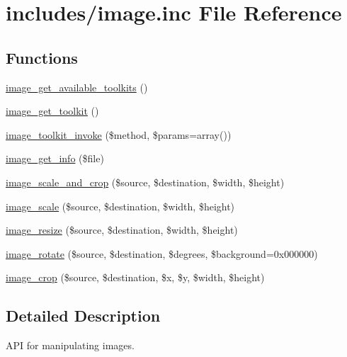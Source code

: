 \hypertarget{image_8inc}{
\section{includes/image.inc File Reference}
\label{image_8inc}
}
\subsection*{Functions}
\begin{CompactItemize}
\item 
\hyperlink{group__image_g190b9b90f931916a5766ed11c29b9326}{image\_\-get\_\-available\_\-toolkits} ()
\item 
\hyperlink{group__image_g08b3ce83f3526f248c1e08b4ee249a3a}{image\_\-get\_\-toolkit} ()
\item 
\hyperlink{group__image_g5429299fdb0dd86b5c8050dc1dba5aee}{image\_\-toolkit\_\-invoke} (\$method, \$params=array())
\item 
\hyperlink{group__image_g64daec548dec0ae4c1d30053446e8f80}{image\_\-get\_\-info} (\$file)
\item 
\hyperlink{group__image_g61e985c6a47a4c9d788b99fba2d452a6}{image\_\-scale\_\-and\_\-crop} (\$source, \$destination, \$width, \$height)
\item 
\hyperlink{group__image_g4015f61f8b5214787a6f649befd4b7bb}{image\_\-scale} (\$source, \$destination, \$width, \$height)
\item 
\hyperlink{group__image_g160782a6325283b224cba85e2a4d3839}{image\_\-resize} (\$source, \$destination, \$width, \$height)
\item 
\hyperlink{group__image_g6827b6bfbfee059fa956f5c3d6f0d716}{image\_\-rotate} (\$source, \$destination, \$degrees, \$background=0x000000)
\item 
\hyperlink{group__image_ge43902efb776c55596b28161e835cd9e}{image\_\-crop} (\$source, \$destination, \$x, \$y, \$width, \$height)
\end{CompactItemize}


\subsection{Detailed Description}
API for manipulating images. 